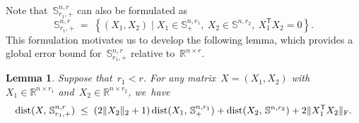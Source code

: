 \documentclass[11pt,a4paper]{article}  %
\newtheorem{lemma}{Lemma}%
\theoremstyle{definition}
\DeclareMathOperator{\dist}{dist}
\newcommand{\RR}{\mathbb{R}}
\newcommand{\col}{r}
\newcommand{\stf}[1]{\mathbb{S}^{#1}}
\newcommand{\fro}{{\scriptstyle{\textnormal{F}}}}
\newcommand{\trs}{{\scriptstyle{\mathsf{T}}}}
\begin{document}
Note that~$\stf{n,\col}_{\col_1,+}$ can also be formulated as
\[
    \stf{n,\col}_{\col_1,+}
    \;=\; \left\{ (X_1, X_2) \mathrel{|} X_1\in\stf{n, \col_1}_+, ~X_2\in\stf{n, \col_2},
    ~X_1^\trs X_2 = 0\right\}.
\]
This formulation motivates us to develop the following lemma, which provides a global error bound
for~$\stf{n,\col}_{\col_1,+}$ relative to~$\RR^{n\times \col}$.
\begin{lemma}\label{lem:X2signStf}
    Suppose that~$\col_1 < \col$.
For any matrix~$X = (X_1, X_2)$ with~$X_1\in \RR^{n\times \col_1}$ and~$X_2\in \RR^{n\times \col_2}$,
we~have%
\begin{equation}\label{X2signStf}
    \dist(X,\, \stf{n,\col}_{\col_1,+})\;\le\;
    (2\|X_2\|_2+1)\dist(X_1,\, \stf{n,\col_1}_+) + \dist(X_2,\, \stf{n,\col_2}) + 2\|X_1^\trs X_2\|_\fro.
\end{equation}
\end{lemma}
\end{document}
